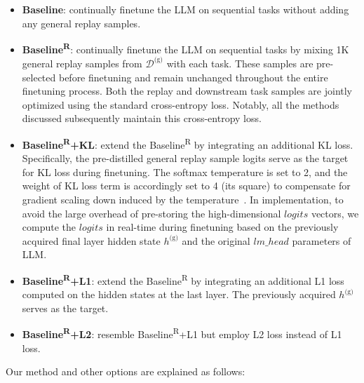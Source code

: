 \begin{itemize}[leftmargin=*, align=left]
    \item \textbf{Baseline}: continually finetune the LLM on sequential tasks without adding any general replay samples.
    \item \textbf{Baseline\textsuperscript{R}}: continually finetune the LLM on sequential tasks by mixing 1K general replay samples from $\mathcal{D}^{\text{(g)}}$ with each task. These samples are pre-selected before finetuning and remain unchanged throughout the entire finetuning process. Both the replay and downstream task samples are jointly optimized using the standard cross-entropy loss.
    Notably, all the methods discussed subsequently maintain this cross-entropy loss.
    
    \item \textbf{Baseline\textsuperscript{R}+KL}: extend the Baseline\textsuperscript{R} by integrating an additional KL loss.
    Specifically, the pre-distilled general replay sample logits serve as the target for KL loss during finetuning.
    The softmax temperature is set to 2, and the weight of KL loss term is accordingly set to 4 (its square) to compensate for gradient scaling down induced by the temperature~\cite{sun2024logit}.
    In implementation, to avoid the large overhead of pre-storing the high-dimensional $logits$ vectors, we compute the $logits$ in real-time during finetuning based on the previously acquired final layer hidden state $h^\text{(g)}$ and the original $lm\_head$ parameters of LLM.
    
    \item \textbf{Baseline\textsuperscript{R}+L1}: extend the Baseline\textsuperscript{R} by integrating an additional L1 loss computed on the hidden states at the last layer. The previously acquired $h^\text{(g)}$ serves as the target.
    \item \textbf{Baseline\textsuperscript{R}+L2}: resemble Baseline\textsuperscript{R}+L1 but employ L2 loss instead of L1 loss.
\end{itemize}
Our method and other options are explained as follows:
